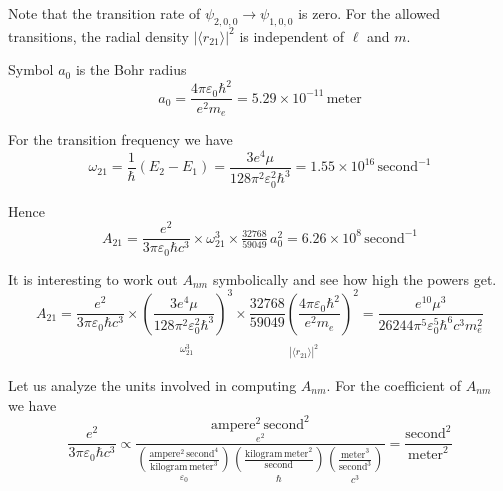 \documentclass[12pt]{article}
\begin{document}
\medskip
\noindent
Note that the transition rate of $\psi_{2,0,0}\rightarrow\psi_{1,0,0}$ is zero.
For the allowed transitions, the radial density
$|\langle r_{21}\rangle|^2$ is independent of $\ell$ and $m$.

\bigskip
\noindent
Symbol $a_0$ is the Bohr radius
\begin{equation*}
a_0=\frac{4\pi\varepsilon_0\hbar^2}{e^2 m_e}
=5.29\times10^{-11}\,\text{meter}
\end{equation*}

\bigskip
\noindent
For the transition frequency we have
\begin{equation*}
\omega_{21}=\frac{1}{\hbar}(E_2-E_1)=\frac{3e^4\mu}{128\pi^2\varepsilon_0^2\hbar^3}
=1.55\times10^{16}\,\text{second}^{-1}
\end{equation*}

\noindent
Hence
\begin{equation*}
A_{21}=\frac{e^2}{3\pi\varepsilon_0\hbar c^3}
\times
\omega_{21}^3
\times
\tfrac{32768}{59049}\,a_0^2
=6.26\times10^8\,\text{second}^{-1}
\end{equation*}

\noindent
It is interesting to work out $A_{nm}$ symbolically and see how high the powers get.
\begin{equation*}
A_{21}=\frac{e^2}{3\pi\varepsilon_0\hbar c^3}
\times
\underset{\substack{\\[1ex]\omega_{21}^3}}
{\left(\frac{3e^4\mu}{128\pi^2\varepsilon_0^2\hbar^3}\right)^3}
\times
\underset{\substack{\\[1ex]|\langle r_{21}\rangle|^2}}
{\frac{32768}{59049}
\left(\frac{4\pi\varepsilon_0\hbar^2}{e^2 m_e}\right)^2}
=\frac{e^{10}\mu^3}{26244\pi^5\varepsilon_0^5\hbar^6 c^3 m_e^2}
\end{equation*}

\noindent
Let us analyze the units involved in computing $A_{nm}$.
For the coefficient of $A_{nm}$ we have
\begin{equation*}
\frac{e^2}{3\pi\varepsilon_0\hbar c^3}\propto
\frac{
\underset{e^2}
{\text{ampere}^2\,\text{second}^2}
}
{
\underset{\varepsilon_0}
{\left(\frac{\text{ampere}^2\,\text{second}^4}{\text{kilogram}\,\text{meter}^3}\right)}
\underset{\hbar}
{\left(\frac{\text{kilogram}\,\text{meter}^2}{\text{second}}\right)}
\underset{c^3}
{\left(\frac{\text{meter}^3}{\text{second}^3}\right)}
}
=\frac{\text{second}^2}{\text{meter}^2}
\end{equation*}
\end{document}
